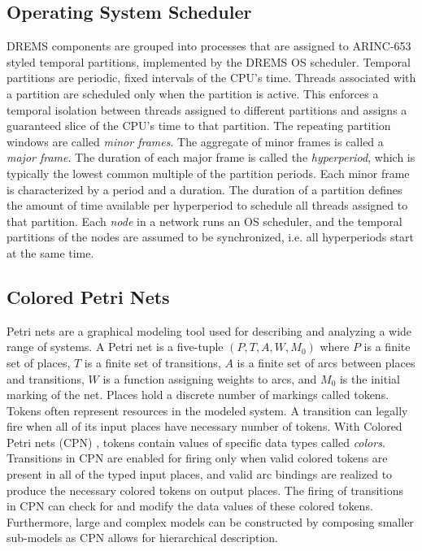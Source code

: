 \subsection{Operating System Scheduler}
DREMS components are grouped into processes that are assigned to ARINC-653 \cite{ARINC-653} styled temporal partitions, implemented by the DREMS OS scheduler. Temporal partitions are periodic, fixed intervals of the CPU's time. Threads associated with a partition are scheduled only when the partition is active. This enforces a temporal isolation between threads assigned to different partitions and assigns a guaranteed slice of the CPU's time to that partition. The repeating partition windows are called \emph{minor frames}. The aggregate of minor frames is called a \emph{major frame}. The duration of each major frame is called the \emph{hyperperiod}, which is typically the lowest common multiple of the partition periods. Each minor frame is characterized by a period and a duration. The duration of a partition defines the amount of time available per hyperperiod to schedule all threads assigned to that partition. Each \emph{node} in a network runs an OS scheduler, and the temporal partitions of the nodes are assumed to be synchronized, i.e. all hyperperiods start at the same time. 

\subsection{Colored Petri Nets}

Petri nets \cite{Murata1989} are a graphical modeling tool used for describing and analyzing a wide range of systems. A Petri net is a five-tuple $(P, T, A, W, M_0)$ where $P$ is a finite set of places, $T$ is a finite set of transitions, $A$ is a finite set of arcs between places and transitions, $W$ is a function assigning weights to arcs, and $M_0$ is the initial marking of the net. Places hold a discrete number of markings called tokens. Tokens often represent resources in the modeled system. A transition can legally fire when all of its input places have necessary number of tokens. 
With Colored Petri nets (CPN) \cite{CPN}, tokens contain values of specific data types called \emph{colors}. Transitions in CPN are enabled for firing only when valid colored tokens are present in all of the typed input places, and valid arc bindings are realized to produce the necessary colored tokens on output places. The firing of transitions in CPN can check for and modify the data values of these colored tokens. Furthermore, large and complex models can be constructed by composing smaller sub-models as CPN allows for hierarchical description. %


